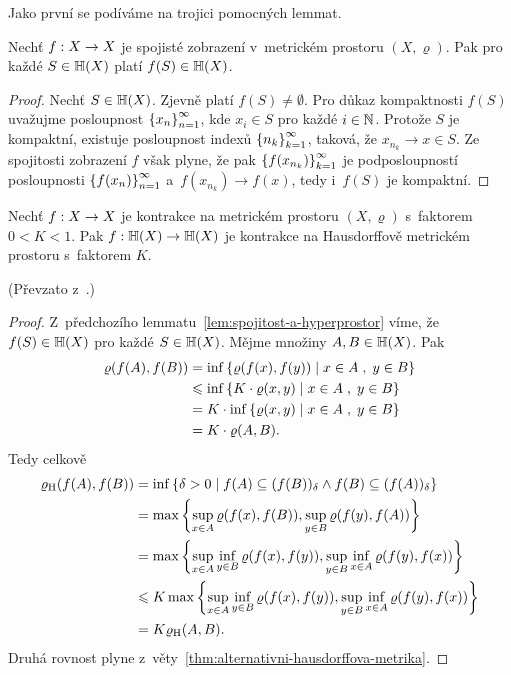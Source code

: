Jako první se podíváme na trojici pomocných lemmat.
\begin{lemma}\label{lem:spojitost-a-hyperprostor}
    Nechť $f:X \rightarrow X$ je spojisté zobrazení v~metrickém prostoru $(X,\varrho)$. Pak pro každé $S\in\mathbb{H}(X)$ platí $f(S)\in\mathbb{H}(X)$.
\end{lemma}
\begin{proof}
    Nechť $S\in\mathbb{H}(X)$. Zjevně platí $f(S)\neq\emptyset$. Pro důkaz kompaktnosti $f(S)$ uvažujme posloupnost $\left\{x_n\right\}_{n=1}^\infty$, kde $x_i\in S$ pro každé $i\in\mathbb{N}$. Protože $S$ je kompaktní, existuje posloupnost indexů $\left\{n_k\right\}_{k=1}^\infty$, taková, že $x_{n_k}\to x\in S$. Ze spojitosti zobrazení $f$ však plyne, že pak $\left\{f(x_{n_k})\right\}_{k=1}^\infty$ je podposloupností posloupnosti $\left\{f(x_n)\right\}_{n=1}^\infty$ a~$f(x_{n_k})\to f(x)$, tedy i~$f(S)$ je kompaktní.
\end{proof}
\begin{lemma}\label{lem:kontrakce-a-hyperprostor}
    Nechť $f:X \rightarrow X$ je kontrakce na metrickém prostoru $(X,\varrho)$ s~faktorem $0<K<1$. Pak $f:\mathbb{H}(X) \rightarrow \mathbb{H}(X)$ je kontrakce na Hausdorffově metrickém prostoru s~faktorem $K$.
\end{lemma}
(Převzato z~\citep[str. 79]{Barnsley1993}.)
\begin{proof}
    Z~předchozího lemmatu~\ref{lem:spojitost-a-hyperprostor} víme, že $f(S)\in\mathbb{H}(X)$ pro každé $S\in\mathbb{H}(X)$. Mějme množiny $A,B\in\mathbb{H}(X)$. Pak
    \begin{align*}
        \varrho(f(A),f(B))&=\inf\left\{\varrho(f(x),f(y))\mid x\in A\;,\;y\in B\right\}\\
        &\leqslant\inf\left\{K\cdot\varrho(x,y)\mid x\in A\;,\;y\in B\right\}\\
        &=K\cdot\inf\left\{\varrho(x,y)\mid x\in A\;,\;y\in B\right\}\\
        &=K\cdot\varrho(A,B).
    \end{align*}
    Tedy celkově
    \begin{align*}
        \varrho_\textup{H}(f(A),f(B))&=\inf\left\{\delta>0\mid f(A)\subseteq(f(B))_\delta\land f(B)\subseteq(f(A))_\delta\right\}\\
        &=\max\left\{\sup_{x\in A}\varrho(f(x),f(B)),\sup_{y\in B}\varrho(f(y),f(A))\right\}\\
        &=\max\left\{\sup_{x\in A}\inf_{y\in B}\varrho(f(x),f(y)),\sup_{y\in B}\inf_{x\in A}\varrho(f(y),f(x))\right\}\\
        &\leqslant K\max\left\{\sup_{x\in A}\inf_{y\in B}\varrho(f(x),f(y)),\sup_{y\in B}\inf_{x\in A}\varrho(f(y),f(x))\right\}\\
        &=K\varrho_\textup{H}(A,B).
    \end{align*}
    Druhá rovnost plyne z~věty~\ref{thm:alternativni-hausdorffova-metrika}.
\end{proof}
